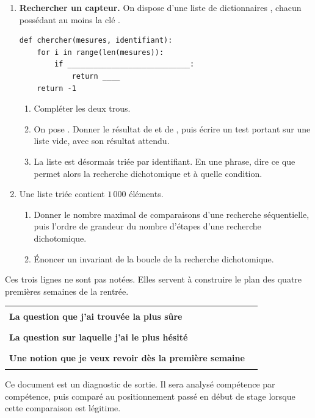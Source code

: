 \documentclass[10pt,a4paper]{article}
\begin{document}
\begin{enumerate}
\needspace{22mm}
\item[\textbf{C1.}] \textbf{Rechercher un capteur.} On dispose d'une liste de dictionnaires
, chacun possédant au moins la clé .
\begin{lstlisting}
def chercher(mesures, identifiant):
    for i in range(len(mesures)):
        if ____________________________:
            return ____
    return -1
\end{lstlisting}
\begin{enumerate}
\item Compléter les deux trous.
\item On pose . Donner le résultat de
 et de , puis écrire un test portant sur
une liste vide, avec son résultat attendu.
\item La liste est désormais triée par identifiant. En une phrase, dire ce que permet alors la recherche
dichotomique et à quelle condition.
\end{enumerate}
\par\vspace{1.2mm}
\needspace{22mm}
\item[\textbf{C2.}] Une liste triée contient $1\,000$ éléments.
\begin{enumerate}
\item Donner le nombre maximal de comparaisons d'une recherche séquentielle, puis l'ordre de grandeur
du nombre d'étapes d'une recherche dichotomique.
\item Énoncer un invariant de la boucle de la recherche dichotomique.
\end{enumerate}
\par\vspace{1.2mm}
\end{enumerate}
\brouillon{\dimexpr\textheight/3\relax}
\newpage
{}
\begin{methodbox}Ces trois lignes ne sont pas notées. Elles servent à construire le plan des quatre premières semaines de la rentrée.\end{methodbox}
\par\noindent\begin{tabularx}{\linewidth}{>{\bfseries}p{62mm} X}
\toprule
La question que j'ai trouvée la plus sûre & \rule{85mm}{0.32pt} \\
La question sur laquelle j'ai le plus hésité & \rule{85mm}{0.32pt} \\
Une notion que je veux revoir dès la première semaine & \rule{85mm}{0.32pt} \\
\bottomrule\end{tabularx}
\vfill
\begin{graybox}\small Ce document est un diagnostic de sortie. Il sera analysé compétence par compétence, puis comparé au positionnement passé en début de stage lorsque cette comparaison est légitime.\end{graybox}
\end{document}
